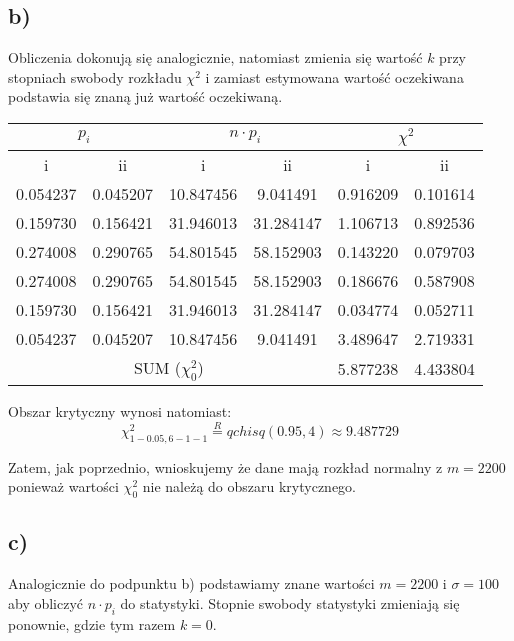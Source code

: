 \documentclass{article}
\begin{document}
\subsection{b)}
Obliczenia dokonują się analogicznie, natomiast zmienia się wartość $k$ przy stopniach swobody rozkładu $\chi^2$ i zamiast estymowana wartość oczekiwana podstawia się znaną już wartość oczekiwaną.

\begin{center} \begin{tabular}{|c|c|c|c|c|c|} \hline
\multicolumn{2}{|c|}{$p_i$} & \multicolumn{2}{|c|}{$n \cdot p_i$} & \multicolumn{2}{|c|}{$\chi^2$} \\ \hline
i & ii & i & ii & i & ii \\ \hline
0.054237 & 0.045207 & 10.847456 & 9.041491 & 0.916209 & 0.101614 \\ \hline
0.159730 & 0.156421 & 31.946013 & 31.284147 & 1.106713 & 0.892536 \\ \hline
0.274008 & 0.290765 & 54.801545 & 58.152903 & 0.143220 & 0.079703 \\ \hline
0.274008 & 0.290765 & 54.801545 & 58.152903 & 0.186676 & 0.587908 \\ \hline
0.159730 & 0.156421 & 31.946013 & 31.284147 & 0.034774 & 0.052711 \\ \hline
0.054237 & 0.045207 & 10.847456 & 9.041491 & 3.489647 & 2.719331 \\ \hline				
\multicolumn{4}{|c|}{SUM ($\chi^2_0$)} & 5.877238 & 4.433804 \\ \hline
\end{tabular} \end{center}

Obszar krytyczny wynosi natomiast:
\[ \chi^2_{1-0.05,6-1-1} \overset{R}{=} qchisq(0.95, 4) \approx 9.487729 \]

Zatem, jak poprzednio, wnioskujemy że dane mają rozkład normalny z $m = 2200$ ponieważ wartości $\chi^2_0$ nie należą do obszaru krytycznego.

\subsection{c)}
Analogicznie do podpunktu b) podstawiamy znane wartości $m = 2200$ i $\sigma = 100$ aby obliczyć $n \cdot p_i$ do statystyki. Stopnie swobody statystyki zmieniają się ponownie, gdzie tym razem $k=0$.
\end{document}
